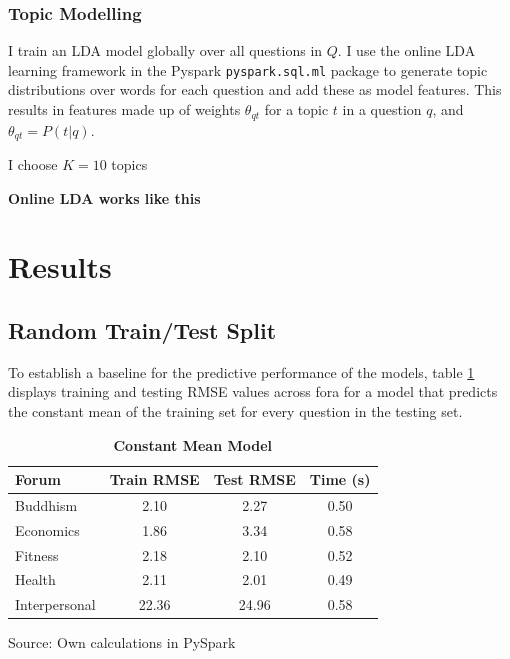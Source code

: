 \documentclass[11pt,preprint, authoryear]{article}
\numberwithin{equation}{section}
\begin{document}
\subsubsection{Topic Modelling}\label{topic-modelling}

I train an LDA model globally over all questions in \(Q\). I use the
online LDA learning framework in the Pyspark \texttt{pyspark.sql.ml}
package to generate topic distributions over words for each question and
add these as model features. This results in features made up of weights
\(\theta_{qt}\) for a topic \(t\) in a question \(q\), and
\(\theta_{qt}=P(t|q).\)

I choose \(K=10\) topics

\textbf{Online LDA works like this}

\newpage

\section{\texorpdfstring{Results
\label{Results}}{Results }}\label{results}

\subsection{Random Train/Test Split}\label{random-traintest-split}

To establish a baseline for the predictive performance of the models,
table \ref{tab:rand_mean_model} displays training and testing RMSE
values across fora for a model that predicts the constant mean of the
training set for every question in the testing set.

\footnotesize

\begin{longtable}[htbp] {@{} lccc @{}} 
\caption{\textbf{Constant Mean Model}} 
\label{tab:rand_mean_model} \\
\toprule
\textbf{Forum} &  \textbf{Train RMSE} &  \textbf{Test RMSE} &  \textbf{Time (s)} \\
\midrule
Buddhism      &                  2.10 &               2.27 &                0.50 \\
Economics     &                  1.86 &               3.34 &                0.58 \\
Fitness       &                  2.18 &               2.10 &                0.52 \\
Health        &                  2.11 &               2.01 &                0.49 \\
Interpersonal &                 22.36 &              24.96 &                0.58 \\
\bottomrule
\end{longtable}\begin{center} Source: Own calculations in PySpark\end{center}
\end{document}
